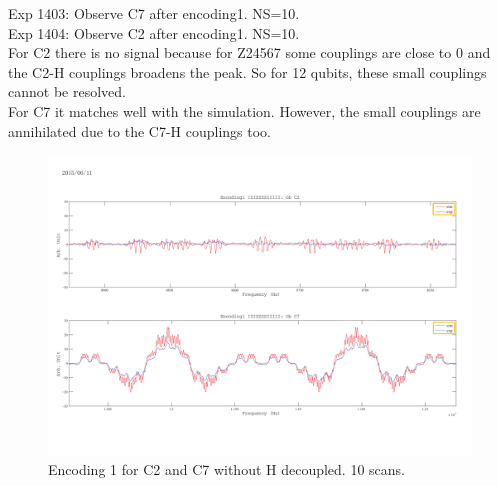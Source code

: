 %
%

\clearpage
Exp 1403: Observe C7 after encoding1. NS=10.\\
Exp 1404: Observe C2 after encoding1. NS=10.\\

For C2 there is no signal because for Z24567 some couplings are close to 0 and the C2-H couplings broadens the peak. So for 12 qubits, these small couplings cannot be resolved.\\
For C7 it matches well with the simulation. However, the small couplings are annihilated due to the C7-H couplings too.

\begin{figure}[htb]
\begin{center}
\includegraphics[width=\columnwidth]{Encoding1_without_decouple.pdf}
\end{center}
\setlength{\abovecaptionskip}{-0.35cm}
\caption{\footnotesize{Encoding 1 for C2 and C7 without H decoupled. 10 scans.}}\label{1403and1404}
\end{figure}

